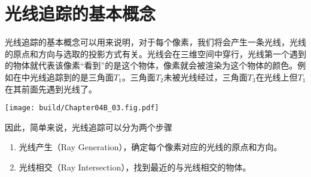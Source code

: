 \section{光线追踪的基本概念}

光线追踪的基本概念可以用来说明，对于每个像素，我们将会产生一条光线，光线的原点和方向与选取的投影方式有关。光线会在三维空间中穿行，光线第一个遇到的物体就代表该像素“看到”的是这个物体，像素就会被渲染为这个物体的颜色。例如在中光线追踪到的是三角面$T_1$。三角面$T_2$未被光线经过，三角面$T_3$在光线上但$T_1$在其前面先遇到光线了。
\begin{Figure}[光线追踪的基本概念]
    \texttt{[image: build/Chapter04B\_03.fig.pdf]}
\end{Figure}

因此，简单来说，光线追踪可以分为两个步骤
\begin{enumerate}
    \item 光线产生（Ray Generation），确定每个像素对应的光线的原点和方向。
    \item 光线相交（Ray Intersection），找到最近的与光线相交的物体。
\end{enumerate}